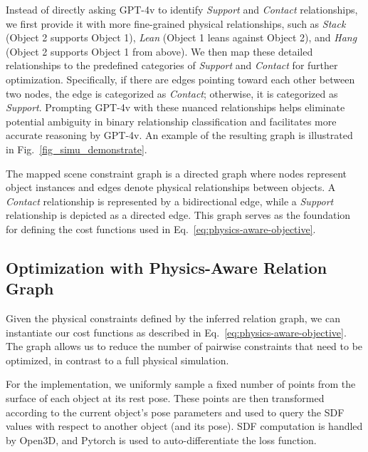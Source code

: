 Instead of directly asking GPT-4v to identify \emph{Support} and \emph{Contact} relationships, we first provide it with more fine-grained physical relationships, such as \emph{Stack} (Object 2 supports Object 1), \emph{Lean} (Object 1 leans against Object 2), and \emph{Hang} (Object 2 supports Object 1 from above). We then map these detailed relationships to the predefined categories of \emph{Support} and \emph{Contact} for further optimization. Specifically, if there are edges pointing toward each other between two nodes, the edge is categorized as \emph{Contact}; otherwise, it is categorized as \emph{Support}. Prompting GPT-4v with these nuanced relationships helps eliminate potential ambiguity in binary relationship classification and facilitates more accurate reasoning by GPT-4v.
An example of the resulting graph is illustrated in Fig.~\ref{fig_simu_demonstrate}.

The mapped scene constraint graph is a directed graph where nodes represent object instances and edges denote physical relationships between objects. A \emph{Contact} relationship is represented by a bidirectional edge, while a \emph{Support} relationship is depicted as a directed edge. This graph serves as the foundation for defining the cost functions used in Eq.~\ref{eq:physics-aware-objective}.




\subsection{Optimization with Physics-Aware Relation Graph}

Given the physical constraints defined by the inferred relation graph, we can instantiate our cost functions as described in Eq.~\ref{eq:physics-aware-objective}. The graph allows us to reduce the number of pairwise constraints that need to be optimized, in contrast to a full physical simulation.

For the implementation, we uniformly sample a fixed number of points from the surface of each object at its rest pose. These points are then transformed according to the current object’s pose parameters and used to query the SDF values with respect to another object (and its pose). SDF computation is handled by Open3D, and Pytorch is used to auto-differentiate the loss function.


